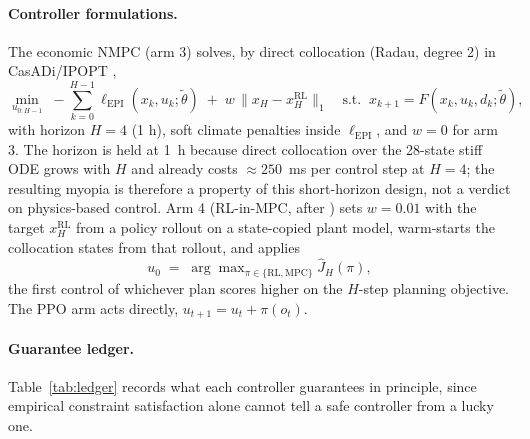 \documentclass[11pt]{article}
\begin{document}
\paragraph{Controller formulations.} The economic NMPC (arm 3) solves, by direct
collocation (Radau, degree 2) in CasADi/IPOPT \citep{andersson2019casadi, wachter2006ipopt},
\begin{equation}
  \min_{u_{0:H-1}}\; -\!\sum_{k=0}^{H-1} \ell_{\mathrm{EPI}}(x_k, u_k; \tilde\theta)
  \;+\; w \,\big\lVert x_H - x^{\mathrm{RL}}_H \big\rVert_1
  \quad \text{s.t.} \;\; x_{k+1} = F(x_k, u_k, d_k; \tilde\theta),
  \label{eq:mpc}
\end{equation}
with horizon $H = 4$ (1 h), soft climate penalties inside $\ell_{\mathrm{EPI}}$, and
$w = 0$ for arm 3. The horizon is held at 1~h because direct collocation over the 28-state stiff ODE grows with $H$ and already costs ${\approx}250$~ms per control step at $H = 4$; the resulting myopia is therefore a property of this short-horizon design, not a verdict on physics-based control. Arm 4 (RL-in-MPC, after \citealp{vanlaatum2026rlmpc}) sets
$w = 0.01$ with the target $x^{\mathrm{RL}}_H$ from a policy rollout on a state-copied
plant model, warm-starts the collocation states from that rollout, and applies
\begin{equation}
  u_0 \;=\; \arg\max\nolimits_{\pi \in \{\mathrm{RL}, \mathrm{MPC}\}} \hat J_H(\pi),
  \label{eq:select}
\end{equation}
the first control of whichever plan scores higher on the $H$-step planning objective.
The PPO arm \citep{schulman2017ppo, raffin2021sb3} acts directly, $u_{t+1} = u_t + \pi(o_t)$.

\paragraph{Guarantee ledger.} Table~\ref{tab:ledger} records what each controller
guarantees in principle, since empirical constraint satisfaction alone cannot tell
a safe controller from a lucky one.
\end{document}
